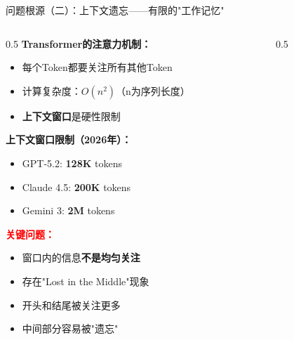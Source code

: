 \documentclass[aspectratio=169,11pt]{beamer}
\begin{document}
\begin{frame}{问题根源（二）：上下文遗忘——有限的"工作记忆"}
    \begin{columns}
        \begin{column}{0.5\textwidth}
            \textbf{Transformer的注意力机制：}
            \begin{itemize}
                \item 每个Token都要关注所有其他Token
                \item 计算复杂度：$O(n^2)$（n为序列长度）
                \item \textbf{上下文窗口}是硬性限制
            \end{itemize}
            
            \vspace{0.3cm}
            \textbf{上下文窗口限制（2026年）：}
            \begin{itemize}
                \item GPT-5.2: \textbf{128K} tokens
                \item Claude 4.5: \textbf{200K} tokens
                \item Gemini 3: \textbf{2M} tokens
            \end{itemize}
            
            \vspace{0.3cm}
            \textbf{\textcolor{red}{关键问题：}}
            \begin{itemize}
                \item 窗口内的信息\textbf{不是均匀关注}
                \item 存在"Lost in the Middle"现象
                \item 开头和结尾被关注更多
                \item 中间部分容易被"遗忘"
            \end{itemize}
        \end{column}
        \begin{column}{0.5\textwidth}
            

\end{column}
\end{columns}
\end{frame}
\end{document}
